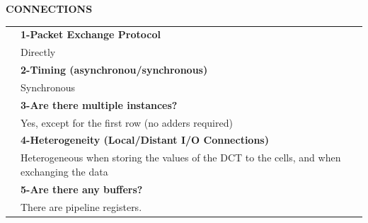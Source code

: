 {\large\textbf{CONNECTIONS}}\vspace{10pt}\\\begin{tabular}{ p{0.2cm} p{14.5cm}}
	&\textbf{1-Packet Exchange Protocol}\\
	&Directly\vspace{7pt}\\
	&\textbf{2-Timing (asynchronou/synchronous)}\\
	&Synchronous\vspace{7pt}\\
	&\textbf{3-Are there multiple instances? }\\
	&Yes, except for the first row (no adders required)\vspace{7pt}\\
	&\textbf{4-Heterogeneity (Local/Distant I/O Connections)}\\
	&Heterogeneous when storing the values of the DCT to the cells, and when exchanging the data\vspace{7pt}\\
	&\textbf{5-Are there any buffers?}\\
	&There are pipeline registers.
\end{tabular}\vspace{14pt}\\
